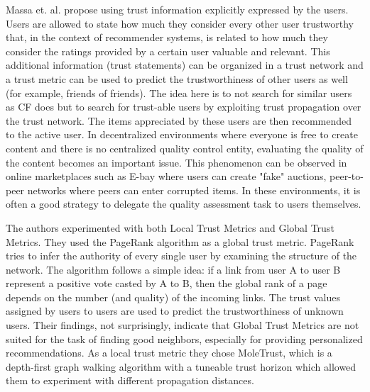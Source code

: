 



Massa et. al. \cite{Massa2004, Massa2007} propose using trust information explicitly expressed by the users. Users are allowed to state how much they consider every other user trustworthy that, in the context of recommender systems, is related to how much they consider the ratings provided by a certain user valuable and relevant. This additional information (trust statements) can be organized in a trust network and a trust metric can be used to predict the trustworthiness of other users as well (for example, friends of friends). The idea here is to not search for similar users as CF does but to search for trust-able users by exploiting trust propagation over the trust network. The items appreciated by these users are then recommended to the active user. In decentralized environments where everyone is free to create content and there is no centralized quality control entity, evaluating the quality of the content becomes an important issue. This phenomenon can be observed in online marketplaces such as E-bay where users can create "fake" auctions, peer-to-peer networks where peers can enter corrupted items. In these environments, it is often a good strategy to delegate the quality assessment task to users themselves.

The authors experimented with both Local Trust Metrics and Global Trust Metrics. They used the PageRank algorithm as a global trust metric. PageRank tries to infer the authority of every single user by examining the structure of the network. The algorithm follows a simple idea: if a link from user A to user B represent a positive vote casted by A to B, then the global rank of a page depends on the number (and quality) of the incoming links. The trust values assigned by users to users are used to predict the trustworthiness of unknown users. Their findings, not surprisingly, indicate that Global Trust Metrics are not suited for the task of finding good neighbors, especially for providing personalized recommendations. As a local trust metric they chose MoleTrust, which is a depth-first graph walking algorithm with a tuneable trust horizon which allowed them to experiment with different propagation distances.

